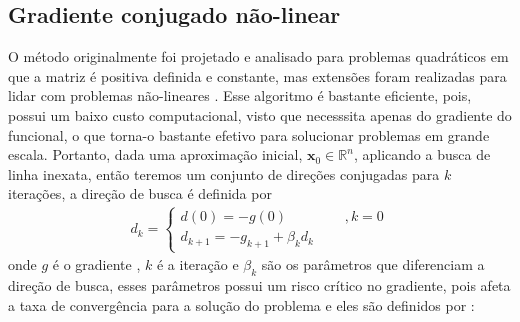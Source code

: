 
\subsection{Gradiente conjugado não-linear}
O método originalmente foi projetado e analisado para problemas quadráticos em que a matriz é positiva definida e constante, mas extensões foram realizadas para lidar com problemas não-lineares \citep{polak_1965,hestenes_1952,fletcher_1964}. Esse algoritmo é bastante eficiente, pois, possui um baixo custo computacional, visto que necesssita apenas do gradiente do funcional, o que torna-o bastante efetivo para solucionar problemas em grande escala. Portanto, dada uma aproximação inicial, $\mathbf{x}_{0} \in \mathbb{R}^{n}$, aplicando a busca de linha inexata, então teremos um conjunto de direções conjugadas para $k$ iterações, a direção de busca é definida por %
    \begin{eqnarray}
         \label{dirdesc}
            d_{k}  = \left\{ \begin{array}{rll}
           {d(0)= -g(0)} ~~~~~~~~~~~~~~~ &{, k=0} \\
           {d_{k+1} =-g_{k+1}+\beta_{k} d_{k} ~~~~~}   
          \end{array} \right.
          \end{eqnarray}
onde $g$ é o gradiente , $k$ é a iteração e $\beta_{k}$ são os parâmetros que diferenciam a direção de busca, esses parâmetros possui um risco crítico no gradiente, pois afeta a taxa de convergência para a solução do problema  e eles são definidos por :
